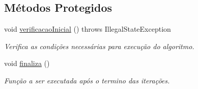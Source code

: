 \subsection*{Métodos Protegidos}
\begin{DoxyCompactItemize}
\item 
void \hyperlink{classic_1_1populacional_1_1algoritmo_1_1_algoritmo_evolucionario_3_01_gextends_01_number_01_6_co1efdb05fe19a950b8d1e9e15f7d06254_a5011151c232024dcf10891066b3b47b9}{verificacao\-Inicial} ()  throws Illegal\-State\-Exception 
\begin{DoxyCompactList}\small\item\em Verifica as condições necessárias para execução do algoritmo. \end{DoxyCompactList}\item 
void \hyperlink{classic_1_1populacional_1_1algoritmo_1_1_algoritmo_evolucionario_3_01_gextends_01_number_01_6_co1efdb05fe19a950b8d1e9e15f7d06254_a73a87fc597bdd4c7c583514062171f7d}{finaliza} ()
\begin{DoxyCompactList}\small\item\em Função a ser executada após o termino das iterações. \end{DoxyCompactList}\end{DoxyCompactItemize}
